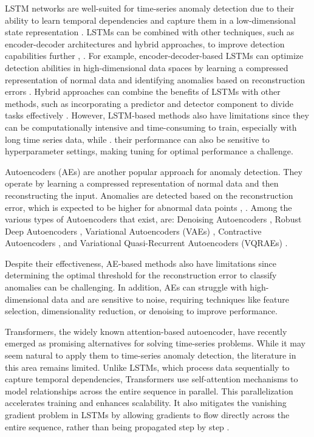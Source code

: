 \documentclass[conference]{IEEEtran}
\begin{document}
LSTM networks are well-suited for time-series anomaly detection due to their ability to learn temporal dependencies and capture them in a low-dimensional state representation \cite{HOJJATI2024106106,10744017}. LSTMs can be combined with other techniques, such as encoder-decoder architectures and hybrid approaches, to improve detection capabilities further \cite{SGUEGLIA2022170}, \cite{HOJJATI2024106106}. For example, encoder-decoder-based LSTMs can optimize detection abilities in high-dimensional data spaces by learning a compressed representation of normal data and identifying anomalies based on reconstruction errors \cite{SGUEGLIA2022170,aerospace6110117}. Hybrid approaches can combine the benefits of LSTMs with other methods, such as incorporating a predictor and detector component to divide tasks effectively \cite{SGUEGLIA2022170}.
However, LSTM-based methods also have limitations since they can be computationally intensive and time-consuming to train, especially with long time series data, while  \cite{8926446,HOJJATI2024106106}. 
their performance can also be sensitive to hyperparameter settings, making tuning for optimal performance a challenge.

Autoencoders (AEs) are another popular approach for anomaly detection. They operate by learning a compressed representation of normal data and then reconstructing the input. Anomalies are detected based on the reconstruction error, which is expected to be higher for abnormal data points \cite{10.1145/3444690}, \cite{10.1007/978-3-030-73100-7_60}. Among the various types of Autoencoders that exist, are:
Denoising Autoencoders \cite{s23052844,10.1145/3691338},
Robust Deep Autoencoders \cite{10.1145/3691338},
Variational Autoencoders (VAEs) \cite{9523565},
Contractive Autoencoders  \cite{SGUEGLIA2022170},
and Variational Quasi-Recurrent Autoencoders (VQRAEs) \cite{8079887}.

Despite their effectiveness, AE-based methods also have limitations since determining the optimal threshold for the reconstruction error to classify anomalies can be challenging. In addition, AEs can struggle with high-dimensional data and are sensitive to noise, requiring techniques like feature selection, dimensionality reduction, or denoising to improve performance.
 
Transformers, the widely known attention-based autoencoder, have recently emerged as promising alternatives for solving time-series problems. While it may seem natural to apply them to time-series anomaly detection, the literature in this area remains limited. Unlike LSTMs, which process data sequentially to capture temporal dependencies, Transformers use self-attention mechanisms to model relationships across the entire sequence in parallel. This parallelization accelerates training and enhances scalability. It also mitigates the vanishing gradient problem in LSTMs by allowing gradients to flow directly across the entire sequence, rather than being propagated step by step \cite{vaswani2023attentionneed}.
\end{document}
